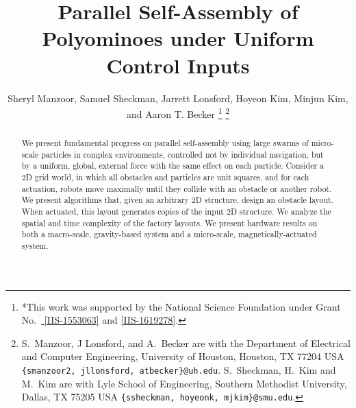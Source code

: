 \documentclass[letterpaper, 10 pt, conference]{ieeeconf}
\begin{document}
\title{\LARGE \bf 
Parallel Self-Assembly of Polyominoes under Uniform Control Inputs 
}
\author{Sheryl Manzoor, Samuel Sheckman, Jarrett Lonsford, Hoyeon Kim, Minjun Kim, and Aaron T. Becker%
\thanks{*This work was supported by the National Science Foundation under Grant No.\ \href{http://nsf.gov/awardsearch/showAward?AWD_ID=1553063}{ [IIS-1553063]} and \href{http://nsf.gov/awardsearch/showAward?AWD_ID=1619278}{[IIS-1619278]}.}%
\thanks{S.~Manzoor, J Lonsford, and  A.~Becker are with the Department of Electrical and Computer Engineering,  University of Houston, Houston, TX 77204 USA        {\tt\small  \{smanzoor2, jllonsford, atbecker\}@uh.edu}. S.~Sheckman, H.~Kim and M.~Kim are with Lyle School of Engineering,   Southern Methodist University, Dallas, TX 75205 USA        {\tt\small  \{ssheckman, hoyeonk, mjkim\}@smu.edu}.%
}
}
\maketitle


\begin{abstract} 
We present fundamental progress on parallel self-assembly using large swarms of micro-scale particles in complex environments, controlled not by individual navigation, but by a uniform, global, external force with the same effect on each particle.
Consider a 2D grid world, in which all obstacles and particles are unit squares,
and for each actuation, robots move maximally until they collide with an obstacle or another robot. 
We present algorithms that, given an arbitrary 2D structure, design an obstacle layout.
 When actuated, this layout generates copies of the input 2D structure.
We analyze the spatial and time complexity of the factory layouts. 
We present hardware results on both a macro-scale, gravity-based system and a micro-scale, magnetically-actuated system.


\end{abstract}












\end{document}
